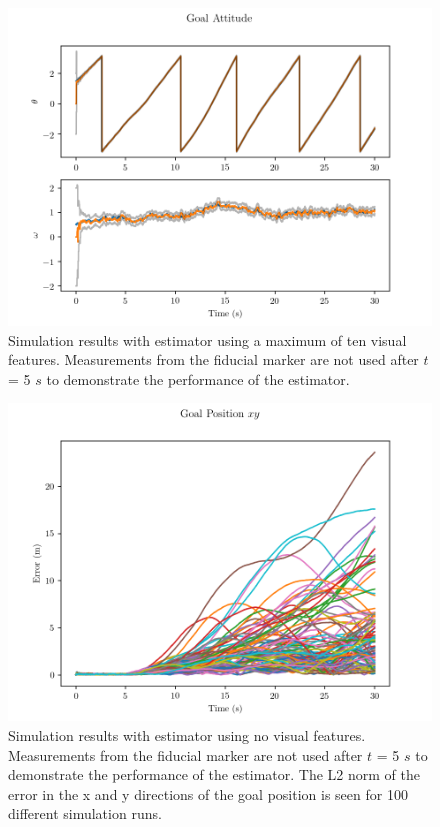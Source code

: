 \begin{figure}
  \centering
  \includegraphics[scale=0.5]{plots/with_lms_gatt.png}
  \caption{Simulation results with estimator using a maximum of ten visual
  features. Measurements from the fiducial marker are not used after $t$ = 5
$s$ to demonstrate the performance of the estimator.}
  \label{fig:with_lms_gatt}
\end{figure}


\begin{figure}
  \centering
  \includegraphics[scale=0.5]{plots/mc_no_lms_xy_err.png}
  \caption{Simulation results with estimator using no visual
  features. Measurements from the fiducial marker are not used after $t$ = 5
$s$ to demonstrate the performance of the estimator. The L2 norm of the error in
the x and y directions of the goal position is seen for 100 different simulation
runs.}
  \label{fig:mc_no_lms_xy_err}
\end{figure}

